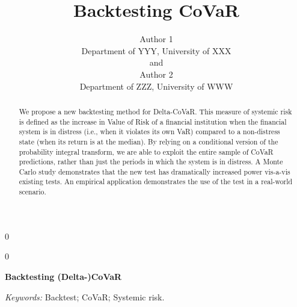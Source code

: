 \documentclass[12pt]{article}
\newcommand{\blind}{0}
\begin{document}
%

\def\spacingset#1{\renewcommand{\baselinestretch}%
{#1}\small\normalsize} \spacingset{1}



\blind
{
  \title{\bf Backtesting CoVaR}
  \author{Author 1\\
    Department of YYY, University of XXX\\
    and \\
    Author 2 \\
    Department of ZZZ, University of WWW}
  \maketitle
} \fi

\blind
{
  \bigskip
  \bigskip
  \bigskip
  \begin{center}
    {\LARGE\bf Backtesting (Delta-)CoVaR}
\end{center}
  \medskip
} \fi

\bigskip
\begin{abstract}
We propose a new backtesting method for Delta-CoVaR. This measure of systemic risk is defined as the increase in Value of Risk of a financial institution when the financial system is in distress (i.e., when it violates its own VaR) compared to a non-distress state (when its return is at the median). By relying on a conditional version of the probability integral transform, we are able to exploit the entire sample of CoVaR predictions, rather than just the periods in which the system is in distress. A Monte Carlo study demonstrates that the new test has dramatically increased power vis-a-vis existing tests. An empirical application demonstrates the use of the test in a real-world scenario.
\end{abstract}
{\it Keywords:}  Backtest; CoVaR; Systemic risk.
\vfill
\end{document}
